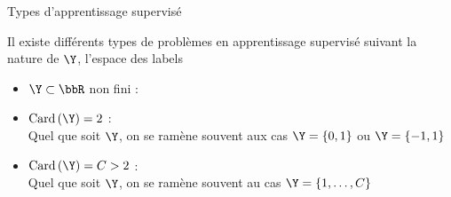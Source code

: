 \documentclass[10pt]{beamer}
\begin{document}

\begin{frame}{Types d'apprentissage supervisé}
	
	Il existe différents types de problèmes en apprentissage supervisé suivant la nature de $\Y$, l'espace des labels\\[1.5em]
 \begin{itemize}
 	\item $\Y  \subset \bbR$ non fini : \\[2em]
 	 	\item $\text{Card}\left(\Y\right)=2$ : \\[0.1em]
 	 	Quel que soit $\Y$, on se ramène souvent aux cas $\Y=\{0,1\}$ ou $\Y=\{-1,1\}$ \\[2em]
\item $\text{Card}\left(\Y\right)= C >2$ : \\[0.1em]
 	 	 	Quel que soit $\Y$, on se ramène souvent au cas $\Y=\{1,\dots,C\}$  \\[2em]


 \end{itemize}
\end{frame}

\end{document}
